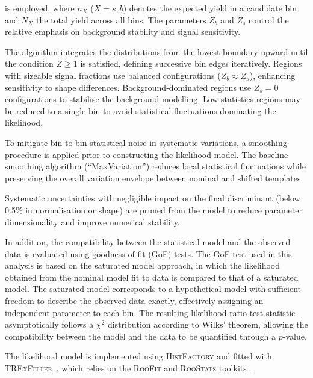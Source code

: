 is employed, where $n_X$ ($X=s,b$) denotes the expected yield in a candidate bin and $N_X$ the total yield across all bins. 
The parameters $Z_b$ and $Z_s$ control the relative emphasis on background stability and signal sensitivity.

The algorithm integrates the distributions from the lowest boundary upward until the condition $Z \geq 1$ is satisfied, defining successive bin edges iteratively. 
Regions with sizeable signal fractions use balanced configurations ($Z_b \approx Z_s$), enhancing sensitivity to shape differences. 
Background-dominated regions use $Z_s=0$ configurations to stabilise the background modelling. 
Low-statistics regions may be reduced to a single bin to avoid statistical fluctuations dominating the likelihood.

To mitigate bin-to-bin statistical noise in systematic variations, a smoothing procedure is applied prior to constructing the likelihood model. 
The baseline smoothing algorithm (``MaxVariation'') reduces local statistical fluctuations while preserving the overall variation envelope between nominal and shifted templates.

Systematic uncertainties with negligible impact on the final discriminant (below 0.5\% in normalisation or shape) are pruned from the model to reduce parameter dimensionality and improve numerical stability.

In addition, the compatibility between the statistical model and the observed data
is evaluated using goodness-of-fit (GoF) tests.
The GoF test used in this analysis is based on the saturated model approach,
in which the likelihood obtained from the nominal model fit to data is compared
to that of a saturated model.
The saturated model corresponds to a hypothetical model with sufficient freedom
to describe the observed data exactly, effectively assigning an independent
parameter to each bin.
The resulting likelihood-ratio test statistic asymptotically follows a $\chi^2$
distribution according to Wilks' theorem, allowing the compatibility between
the model and the data to be quantified through a $p$-value.

The likelihood model is implemented using \textsc{HistFactory}\cite{HistFactory2012} and fitted with \textsc{TRExFitter}~\cite{TRExFitterTwiki}, which relies on the \textsc{RooFit}\cite{RooFit2003,RooFitWeb} and \textsc{RooStats} toolkits~\cite{RooStats2010}.
